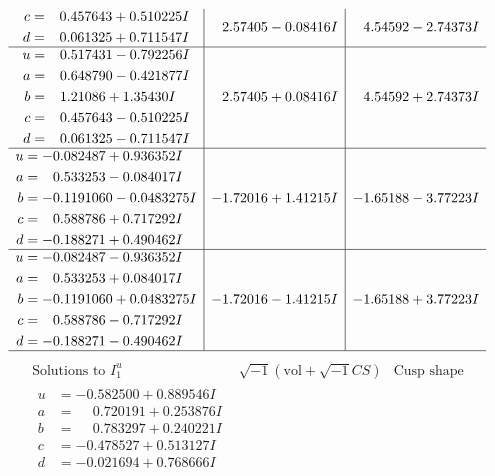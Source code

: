 \documentclass[1p]{elsarticle_modified}
\theoremstyle{definition}
\newcommand{\I}{\sqrt{-1}}
\begin{document}
$$\begin{array}{c|c|c}
\begin{aligned}
c &= \phantom{-}0.457643 + 0.510225 I \\
d &= \phantom{-}0.061325 + 0.711547 I\end{aligned}
 & \phantom{-}2.57405 - 0.08416 I & \phantom{-}4.54592 - 2.74373 I \\ \hline\begin{aligned}
u &= \phantom{-}0.517431 - 0.792256 I \\
a &= \phantom{-}0.648790 - 0.421877 I \\
b &= \phantom{-}1.21086 + 1.35430 I \\
c &= \phantom{-}0.457643 - 0.510225 I \\
d &= \phantom{-}0.061325 - 0.711547 I\end{aligned}
 & \phantom{-}2.57405 + 0.08416 I & \phantom{-}4.54592 + 2.74373 I \\ \hline\begin{aligned}
u &= -0.082487 + 0.936352 I \\
a &= \phantom{-}0.533253 - 0.084017 I \\
b &= -0.1191060 - 0.0483275 I \\
c &= \phantom{-}0.588786 + 0.717292 I \\
d &= -0.188271 + 0.490462 I\end{aligned}
 & -1.72016 + 1.41215 I & -1.65188 - 3.77223 I \\ \hline\begin{aligned}
u &= -0.082487 - 0.936352 I \\
a &= \phantom{-}0.533253 + 0.084017 I \\
b &= -0.1191060 + 0.0483275 I \\
c &= \phantom{-}0.588786 - 0.717292 I \\
d &= -0.188271 - 0.490462 I\end{aligned}
 & -1.72016 - 1.41215 I & -1.65188 + 3.77223 I\\
 \hline 
 \end{array}$$\newpage$$\begin{array}{c|c|c}  
\text{Solutions to }I^u_{1}& \I (\text{vol} + \sqrt{-1}CS) & \text{Cusp shape}\\
 \hline 
\begin{aligned}
u &= -0.582500 + 0.889546 I \\
a &= \phantom{-}0.720191 + 0.253876 I \\
b &= \phantom{-}0.783297 + 0.240221 I \\
c &= -0.478527 + 0.513127 I \\
d &= -0.021694 + 0.768666 I\end{aligned}

\end{array}$$
\end{document}
